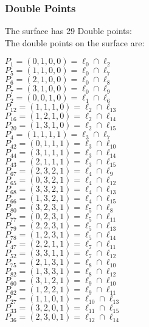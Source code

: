 \documentclass{article}
\begin{document}
{\subsubsection*{Double Points}
The surface has 29 Double points:\\
The double points on the surface are:\\
\begin{multicols}{2}
\noindent
$P_{1} = ( 0, 1, 0, 0 ) = \ell_{0} \cap \ell_{2} $\\
$P_{5} = ( 1, 1, 0, 0 ) = \ell_{0} \cap \ell_{7} $\\
$P_{6} = ( 2, 1, 0, 0 ) = \ell_{0} \cap \ell_{8} $\\
$P_{7} = ( 3, 1, 0, 0 ) = \ell_{0} \cap \ell_{9} $\\
$P_{2} = ( 0, 0, 1, 0 ) = \ell_{1} \cap \ell_{6} $\\
$P_{12} = ( 1, 1, 1, 0 ) = \ell_{2} \cap \ell_{13} $\\
$P_{16} = ( 1, 2, 1, 0 ) = \ell_{2} \cap \ell_{14} $\\
$P_{20} = ( 1, 3, 1, 0 ) = \ell_{2} \cap \ell_{15} $\\
$P_{4} = ( 1, 1, 1, 1 ) = \ell_{3} \cap \ell_{7} $\\
$P_{42} = ( 0, 1, 1, 1 ) = \ell_{3} \cap \ell_{10} $\\
$P_{44} = ( 3, 1, 1, 1 ) = \ell_{3} \cap \ell_{14} $\\
$P_{43} = ( 2, 1, 1, 1 ) = \ell_{3} \cap \ell_{15} $\\
$P_{67} = ( 2, 3, 2, 1 ) = \ell_{4} \cap \ell_{9} $\\
$P_{65} = ( 0, 3, 2, 1 ) = \ell_{4} \cap \ell_{12} $\\
$P_{68} = ( 3, 3, 2, 1 ) = \ell_{4} \cap \ell_{13} $\\
$P_{66} = ( 1, 3, 2, 1 ) = \ell_{4} \cap \ell_{15} $\\
$P_{80} = ( 3, 2, 3, 1 ) = \ell_{5} \cap \ell_{8} $\\
$P_{77} = ( 0, 2, 3, 1 ) = \ell_{5} \cap \ell_{11} $\\
$P_{79} = ( 2, 2, 3, 1 ) = \ell_{5} \cap \ell_{13} $\\
$P_{78} = ( 1, 2, 3, 1 ) = \ell_{5} \cap \ell_{14} $\\
$P_{47} = ( 2, 2, 1, 1 ) = \ell_{7} \cap \ell_{11} $\\
$P_{52} = ( 3, 3, 1, 1 ) = \ell_{7} \cap \ell_{12} $\\
$P_{75} = ( 2, 1, 3, 1 ) = \ell_{8} \cap \ell_{10} $\\
$P_{82} = ( 1, 3, 3, 1 ) = \ell_{8} \cap \ell_{12} $\\
$P_{60} = ( 3, 1, 2, 1 ) = \ell_{9} \cap \ell_{10} $\\
$P_{62} = ( 1, 2, 2, 1 ) = \ell_{9} \cap \ell_{11} $\\
$P_{27} = ( 1, 1, 0, 1 ) = \ell_{10} \cap \ell_{13} $\\
$P_{33} = ( 3, 2, 0, 1 ) = \ell_{11} \cap \ell_{15} $\\
$P_{36} = ( 2, 3, 0, 1 ) = \ell_{12} \cap \ell_{14} $\\
\end{multicols}
}
\end{document}
